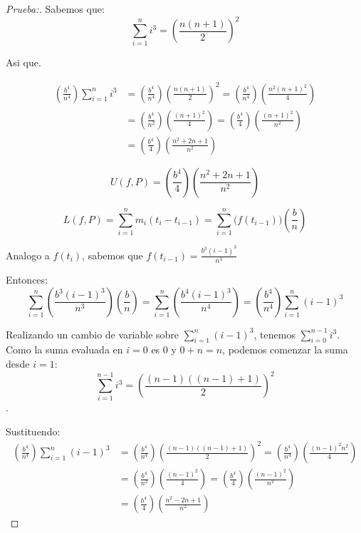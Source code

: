 \documentclass[12pt]{article}
\begin{document}
\begin{enumerate}[\hspace{9px} a)]
\begin{proof}[Prueba:]
            Sabemos que: \[\sum_{i=1}^n i^3 = \left(\frac{n(n+1)}{2}\right)^2\]

            Asi que.

            \begin{align*}
                \left(\frac{b^4}{n^4}\right) \sum_{i=1}^n i^3 &= \left(\frac{b^4}{n^4}\right)\left(\frac{n(n+1)}{2}\right)^2 = \left(\frac{b^4}{n^4}\right)\left(\frac{n^2(n+1)^2}{4}\right) \\
                &= \left(\frac{b^4}{n^2}\right)\left(\frac{(n+1)^2}{4}\right) = \left(\frac{b^4}{4}\right)\left(\frac{(n+1)^2}{n^2}\right) \\
                &= \left(\frac{b^4}{4}\right)\left(\frac{n^2+2n+1}{n^2}\right)
            \end{align*}

            \[U(f,P)=\left(\frac{b^4}{4}\right)\left(\frac{n^2+2n+1}{n^2}\right)\]

            \begin{equation*}%
                L(f,P)=\sum_{i=1}^n m_i(t_i-t_{i-1}) = \sum_{i=1}^n \big(f(t_{i-1})\big)\left(\displaystyle\frac{b}{n}\right)
            \end{equation*}

            Analogo a \(f(t_i)\), sabemos que \(f(t_{i-1})=\displaystyle\frac{b^3(i-1)^3}{n^3}\)

            Entonces:
            \begin{equation*}
                \sum_{i=1}^n \left(\frac{b^3(i-1)^3}{n^3}\right)\left(\displaystyle\frac{b}{n}\right) = \sum_{i=1}^n \left(\frac{b^4(i-1)^3}{n^4}\right) = \left(\frac{b^4}{n^4}\right)\sum_{i=1}^n (i-1)^3
            \end{equation*}

            Realizando un cambio de variable sobre \(\sum_{i=1}^n (i-1)^3\), tenemos \(\sum_{i=0}^{n-1} i^3\). Como la suma evaluada en $i=0$ es 0 y \(0+n=n\), podemos comenzar la suma desde \(i=1\): \[\sum_{i=1}^{n-1} i^3 = \displaystyle\left(\frac{(n-1)((n-1)+1)}{2}\right)^2\].

            Sustituendo:
            \begin{align*}
                \left(\frac{b^4}{n^4}\right)\sum_{i=1}^n (i-1)^3 &= \left(\frac{b^4}{n^4}\right)\left(\frac{(n-1)((n-1)+1)}{2}\right)^2 = \left(\frac{b^4}{n^4}\right)\left(\frac{(n-1)^2n^2}{4}\right) \\ &= \left(\frac{b^4}{n^2}\right)\left(\frac{(n-1)^2}{4}\right) = \left(\frac{b^4}{4}\right)\left(\frac{(n-1)^2}{n^2}\right) \\
                &= \left(\frac{b^4}{4}\right)\left(\frac{n^2-2n+1}{n^2}\right)
            \end{align*}


\end{proof}
\end{enumerate}
\end{document}
